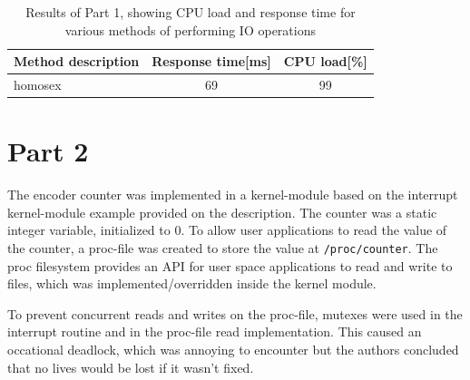 \documentclass{article}
\begin{document}
\begin{table}[h]
	\caption{Results of Part 1, showing CPU load and response time for various methods of
		performing IO operations}\label{tab:part1-results}
	\begin{center}
		\begin{tabular}[c]{l|c|c}
			\hline
			\multicolumn{1}{c|}{\textbf{Method description}} &
			\multicolumn{1}{c|}{\textbf{Response time[ms]}}  &
			\multicolumn{1}{c}{\textbf{CPU load[\%]}}                  \\
			\hline
			homosex                                          & 69 & 99 \\
			\hline
		\end{tabular}
	\end{center}
\end{table}



\clearpage
\section*{Part 2}
The encoder counter was implemented in a kernel-module based on the interrupt
kernel-module example provided on the description. The counter was a static integer
variable, initialized to 0. To allow user applications to read the value of the counter,
a proc-file was created to store the value at \texttt{/proc/counter}. The proc filesystem
provides an API for user space applications to read and write to files, which was
implemented/overridden inside the kernel module.

To prevent concurrent reads and writes on the proc-file,
mutexes were used in the interrupt routine and in the proc-file read
implementation. This caused an occational deadlock, which was annoying to encounter but
the authors concluded that no lives would be lost if it wasn't fixed.
\end{document}
